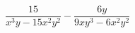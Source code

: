 \begin{ex}
	\begin{condition}
		\( \dfrac{15}{x^3y-15x^2y^2}-\dfrac{6y}{9xy^3-6x^2y^2} \)
	\end{condition}
\end{ex}